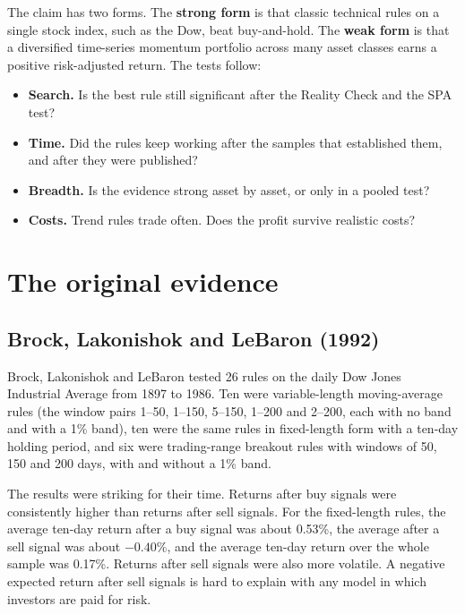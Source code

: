 The claim has two forms. The \textbf{strong form} is that classic technical rules on a single stock index, such as the Dow, beat buy-and-hold. The \textbf{weak form} is that a diversified time-series momentum portfolio across many asset classes earns a positive risk-adjusted return. The tests follow:

\begin{itemize}
  \item \textbf{Search.} Is the best rule still significant after the Reality Check and the SPA test?
  \item \textbf{Time.} Did the rules keep working after the samples that established them, and after they were published?
  \item \textbf{Breadth.} Is the evidence strong asset by asset, or only in a pooled test?
  \item \textbf{Costs.} Trend rules trade often. Does the profit survive realistic costs?
\end{itemize}

\section{The original evidence}
\label{sec:08-evidence}

\subsection{Brock, Lakonishok and LeBaron (1992)}

Brock, Lakonishok and LeBaron tested 26 rules on the daily Dow Jones Industrial Average from 1897 to 1986. Ten were variable-length moving-average rules (the window pairs 1--50, 1--150, 5--150, 1--200 and 2--200, each with no band and with a 1\% band), ten were the same rules in fixed-length form with a ten-day holding period, and six were trading-range breakout rules with windows of 50, 150 and 200 days, with and without a 1\% band.

The results were striking for their time. Returns after buy signals were consistently higher than returns after sell signals. For the fixed-length rules, the average ten-day return after a buy signal was about 0.53\%, the average after a sell signal was about $-0.40\%$, and the average ten-day return over the whole sample was 0.17\%. Returns after sell signals were also more volatile. A negative expected return after sell signals is hard to explain with any model in which investors are paid for risk.

